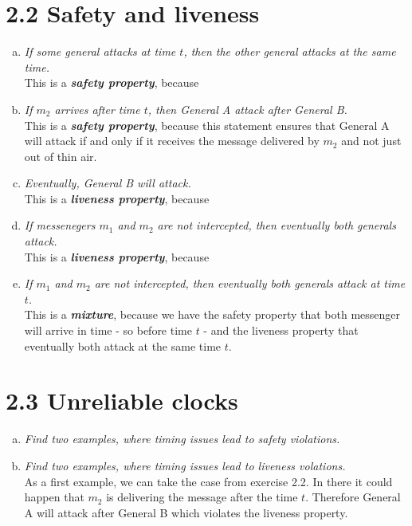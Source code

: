 \documentclass{article}
\begin{document}
	\section*{2.2 Safety and liveness}
	\begin{adjustwidth}{2em}{2em}	
		\begin{enumerate}[(a)]
			\item \textit{If some general attacks at time $t$, then the other general attacks at the same time.} \\
			This is a \textit{\textbf{safety property}}, because 
			\item \textit{If $m_2$ arrives after time $t$, then General A attack after General B.} \\
			This is a \textit{\textbf{safety property}}, because this statement ensures that General A will attack if and only if it receives the message delivered by $m_2$ and not just out of thin air.
			\item \textit{Eventually, General B will attack.} \\
			This is a \textit{\textbf{liveness property}}, because
			\item \textit{If messenegers $m_1$ and $m_2$ are not intercepted, then eventually both generals attack.} \\
			This is a \textit{\textbf{liveness property}}, because
			\item \textit{If $m_1$ and $m_2$ are not intercepted, then eventually both generals attack at time $t$.} \\
			This is a \textit{\textbf{mixture}}, because we have the safety property that both messenger will arrive in time - so before time $t$ - and the liveness property that eventually both attack at the same time $t$.
		\end{enumerate}			
	\end{adjustwidth}
	
	\section*{2.3 Unreliable clocks}
	\begin{adjustwidth}{2em}{2em}
		\begin{enumerate}[(a)]
			\item \textit{Find two examples, where timing issues lead to safety violations.} \\
			\item \textit{Find two examples, where timing issues lead to liveness volations.} \\
			As a first example, we can take the case from exercise 2.2. In there it could happen that $m_2$ is delivering the message after the time $t$. Therefore General A will attack after General B which violates the liveness property.
		\end{enumerate}			
	\end{adjustwidth}
\end{document}
